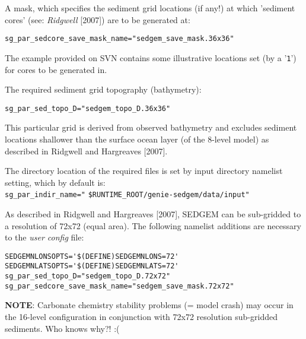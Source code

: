 \documentclass[10pt,twoside]{article}
\begin{document}
\begin{compactitem}
        
        \item A mask, which specifies the sediment grid locations (if any!) at which 'sediment cores' (see: \textit{Ridgwell} [2007]) are to be generated at:
        \vspace{-5.5pt}\begin{verbatim}sg_par_sedcore_save_mask_name="sedgem_save_mask.36x36"\end{verbatim}\vspace{-5.5pt}
        The example provided on SVN contains some illustrative locations set (by a '\texttt{1}') for cores to be generated in.
        
        \item The required sediment grid topography (bathymetry):
        \vspace{-5.5pt}\begin{verbatim}sg_par_sed_topo_D="sedgem_topo_D.36x36"\end{verbatim}\vspace{-5.5pt}
        This particular grid is derived from observed bathymetry and excludes sediment locations shallower than the surface ocean layer (of the 8-level model) as described in Ridgwell and Hargreaves [2007].
        
\end{compactitem}

The directory location of the required files is set by input directory namelist setting, which by default is:
\\\texttt{sg\_par\_indir\_name="} \texttt{\$RUNTIME\_ROOT/genie-sedgem/data/input"}

As described in Ridgwell and Hargreaves [2007], SEDGEM can be sub-gridded to a resolution of 72x72 (equal area). The following namelist additions are necessary to the \textit{user config} file:
\vspace{-5.5pt}\begin{verbatim}
SEDGEMNLONSOPTS='$(DEFINE)SEDGEMNLONS=72'
SEDGEMNLATSOPTS='$(DEFINE)SEDGEMNLATS=72'
sg_par_sed_topo_D="sedgem_topo_D.72x72"
sg_par_sedcore_save_mask_name="sedgem_save_mask.72x72"
\end{verbatim}\vspace{-5.5pt}

\textbf{NOTE}: Carbonate chemistry stability problems (= model crash) may occur in the 16-level configuration in conjunction with 72x72 resolution sub-gridded sediments. Who knows why?! :(
\end{document}
